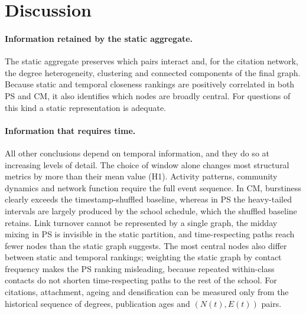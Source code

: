 \section{Discussion}
\label{sec:discussion}

\paragraph{Information retained by the static aggregate.}
The static aggregate preserves which pairs interact and, for the citation network, the
degree heterogeneity, clustering and connected components of the final graph. Because
static and temporal closeness rankings are positively correlated in both PS and CM, it also
identifies which nodes are broadly central. For questions of this kind a static
representation is adequate.

\paragraph{Information that requires time.}
All other conclusions depend on temporal information, and they do so at increasing levels
of detail. The choice of window alone changes most structural metrics by more than their
mean value (H1). Activity patterns, community dynamics and network function require the
full event sequence. In CM, burstiness clearly exceeds the timestamp-shuffled baseline,
whereas in PS the heavy-tailed intervals are largely produced by the school schedule, which
the shuffled baseline retains. Link turnover cannot be represented by a single graph, the
midday mixing in PS is invisible in the static partition, and time-respecting paths reach
fewer nodes than the static graph suggests. The most central nodes also differ between
static and temporal rankings; weighting the static graph by contact frequency makes the PS
ranking misleading, because repeated within-class contacts do not shorten time-respecting
paths to the rest of the school. For citations, attachment, ageing and densification can be
measured only from the historical sequence of degrees, publication ages and
$(N(t),E(t))$ pairs.

